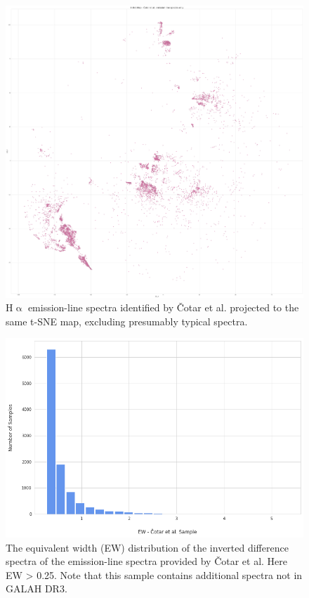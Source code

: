 \begin{figure}[!htb]
\centering
\includegraphics[scale=0.10]{figures/tsne_cotar_only.png}
\caption{H$\upalpha$ emission-line spectra identified by Čotar et al. projected to the same t-SNE map, excluding presumably typical spectra.}
\end{figure}

\begin{figure}[!htb]
\centering
\includegraphics[scale=0.50]{figures/EW hist cotar.png}
\caption{The equivalent width (EW) distribution of the inverted difference spectra of the emission-line spectra provided by Čotar et al. Here EW > 0.25. Note that this sample contains additional spectra not in GALAH DR3.}
\end{figure}


